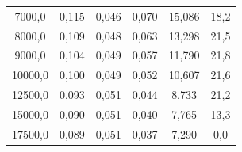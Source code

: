 \documentclass[a4paper, czech]{article}
\begin{document}
\begin{table}[H]
\begin{tabular}{cccccc}
        7000,0     & 0,115                                                                       & 0,046                                                                       & 0,070                                                                 & 15,086                                                         & 18,2                                                          \\
        8000,0     & 0,109                                                                       & 0,048                                                                       & 0,063                                                                 & 13,298                                                         & 21,5                                                          \\
        9000,0     & 0,104                                                                       & 0,049                                                                       & 0,057                                                                 & 11,790                                                         & 21,8                                                          \\
        10000,0    & 0,100                                                                       & 0,049                                                                       & 0,052                                                                 & 10,607                                                         & 21,6                                                          \\
        12500,0    & 0,093                                                                       & 0,051                                                                       & 0,044                                                                 & 8,733                                                          & 21,2                                                          \\
        15000,0    & 0,090                                                                       & 0,051                                                                       & 0,040                                                                 & 7,765                                                          & 13,3                                                          \\
        17500,0    & 0,089                                                                       & 0,051                                                                       & 0,037                                                                 & 7,290                                                          & 0,0                                                           \\

\end{tabular}
\end{table}
\end{document}
